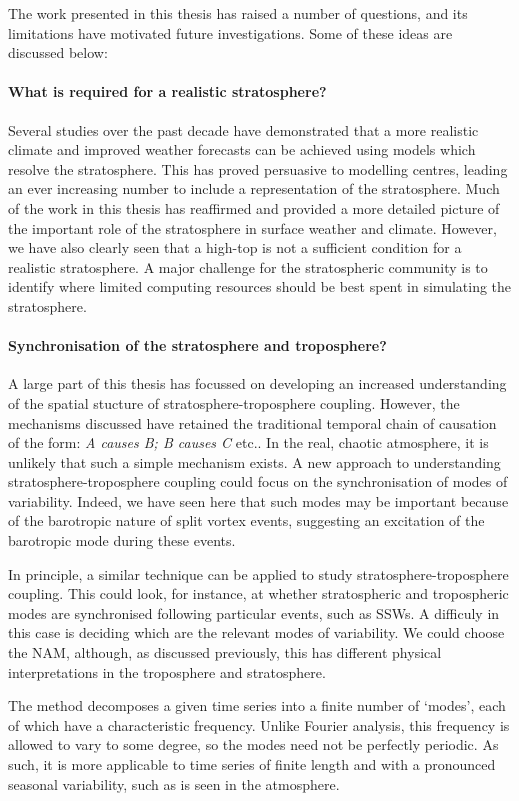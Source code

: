 The work presented in this thesis has raised a number of questions, and its
limitations have motivated future investigations. Some of these ideas are
discussed below:

\paragraph{What is required for a realistic stratosphere?} Several studies over
the past decade have demonstrated that a more realistic climate and improved
weather forecasts can be achieved using models which resolve the
stratosphere. This has proved persuasive to modelling centres, leading an ever
increasing number to include a representation of the stratosphere. Much of the
work in this thesis has reaffirmed and provided a more detailed picture of the
important role of the stratosphere in surface weather and climate. However, we
have also clearly seen that a high-top is not a sufficient condition for a
realistic stratosphere. A major challenge for the stratospheric community is to
identify where limited computing resources should be best spent in simulating
the stratosphere.





\paragraph{Synchronisation of the stratosphere and troposphere?} A large part of
this thesis has focussed on developing an increased understanding of the spatial
stucture of stratosphere-troposphere coupling. However, the mechanisms discussed
have retained the traditional temporal chain of causation of the form: \emph{A
  causes B; B causes C} etc.. In the real, chaotic atmosphere, it is unlikely
that such a simple mechanism exists. A new approach to understanding
stratosphere-troposphere coupling could focus on the synchronisation of modes of
variability. Indeed, we have seen here that such modes may be important because
of the barotropic nature of split vortex events, suggesting an excitation of the
barotropic mode during these events.



In principle, a similar technique can be applied to study
stratosphere-troposphere coupling. This could look, for instance, at whether
stratospheric and tropospheric modes are synchronised following particular
events, such as SSWs. A difficuly in this case is deciding which are the
relevant modes of variability. We could choose the NAM, although, as discussed
previously, this has different physical interpretations in the troposphere and
stratosphere.

The method decomposes a given time series
into a finite number of `modes', each of which have a characteristic
frequency. Unlike Fourier analysis, this frequency is allowed to vary to some
degree, so the modes need not be perfectly periodic. As such, it is more
applicable to time series of finite length and with a pronounced seasonal
variability, such as is seen in the atmosphere.



